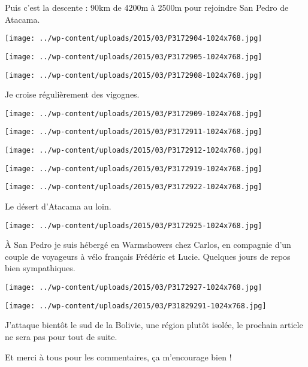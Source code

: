 \pagebreak
 Puis c'est la descente : 90km de 4200m à 2500m pour rejoindre San Pedro de Atacama. 
\begin{center} \texttt{[image: ../wp-content/uploads/2015/03/P3172904-1024x768.jpg]} \end{center}
\begin{center} \texttt{[image: ../wp-content/uploads/2015/03/P3172905-1024x768.jpg]} \end{center}
\begin{center} \texttt{[image: ../wp-content/uploads/2015/03/P3172908-1024x768.jpg]} \end{center}

 Je croise régulièrement des vigognes.
\begin{center} \texttt{[image: ../wp-content/uploads/2015/03/P3172909-1024x768.jpg]} \end{center}
\begin{center} \texttt{[image: ../wp-content/uploads/2015/03/P3172911-1024x768.jpg]} \end{center}
\begin{center} \texttt{[image: ../wp-content/uploads/2015/03/P3172912-1024x768.jpg]} \end{center}
\begin{center} \texttt{[image: ../wp-content/uploads/2015/03/P3172919-1024x768.jpg]} \end{center}
\vfill
\begin{center} \texttt{[image: ../wp-content/uploads/2015/03/P3172922-1024x768.jpg]} \end{center}
\vspace{-\topsep}
\vspace{-0.75mm}

\pagebreak
 Le désert d'Atacama au loin. 
\begin{center} \texttt{[image: ../wp-content/uploads/2015/03/P3172925-1024x768.jpg]} \end{center}

 \`A San Pedro je suis hébergé en Warmshowers chez Carlos, en compagnie d'un couple de voyageurs à vélo français Frédéric et Lucie. Quelques jours de repos bien sympathiques. 
\begin{center} \texttt{[image: ../wp-content/uploads/2015/03/P3172927-1024x768.jpg]} \end{center}
\begin{center} \texttt{[image: ../wp-content/uploads/2015/03/P31829291-1024x768.jpg]} \end{center}

J'attaque bientôt le sud de la Bolivie, une région plutôt isolée, le prochain article ne sera pas pour tout de suite.

 Et merci à tous pour les commentaires, ça m'encourage bien !
